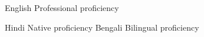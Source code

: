 
\begin{cvskills}

  \cvskill
    {English} %
    {Professional proficiency} %

  \cvskill
    {Hindi} %
    {Native proficiency} %
  \cvskill
    {Bengali} %
    {Bilingual proficiency} %

\end{cvskills}
